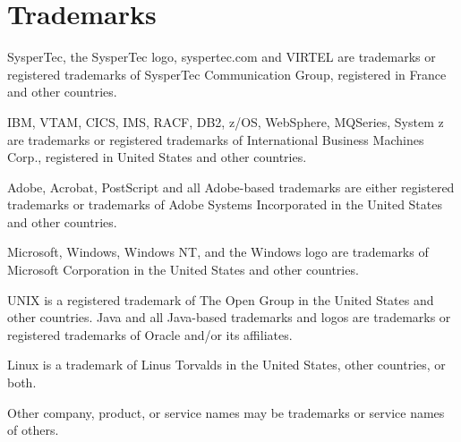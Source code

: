 \documentclass[letterpaper,10pt,english]{sphinxmanual}
\begin{document}
\section{Trademarks}
\label{\detokenize{Installation_Guide:trademarks}}
SysperTec, the SysperTec logo, syspertec.com and VIRTEL are trademarks or registered trademarks of SysperTec
Communication Group, registered in France and other countries.

IBM, VTAM, CICS, IMS, RACF, DB2, z/OS, WebSphere, MQSeries, System z are trademarks or registered trademarks of
International Business Machines Corp., registered in United States and other countries.

Adobe, Acrobat, PostScript and all Adobe-based trademarks are either registered trademarks or trademarks of Adobe
Systems Incorporated in the United States and other countries.

Microsoft, Windows, Windows NT, and the Windows logo are trademarks of Microsoft Corporation in the United States
and other countries.

UNIX is a registered trademark of The Open Group in the United States and other countries.
Java and all Java-based trademarks and logos are trademarks or registered trademarks of Oracle and/or its affiliates.

Linux is a trademark of Linus Torvalds in the United States, other countries, or both.

Other company, product, or service names may be trademarks or service names of others.



\renewcommand{\indexname}{Index}
\printindex
\end{document}
